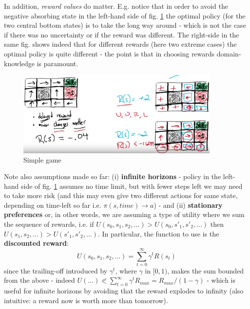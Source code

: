\documentclass[11pt]{article}
\begin{document}
In addition, \textit{reward values} do matter. E.g. notice that in order to avoid the negative absorbing state in the left-hand side of fig. \ref{reinforcement_1} the optimal policy (for the two central bottom states) is to take the long way around - which is not the case if there was no uncertainty or if the reward was different. The right-side in the same fig. shows indeed that for different rewards (here two extreme cases) the optimal policy is quite different - the point is that in choosing rewards domain-knowledge is paramount.
\begin{figure}[htbp] 
	\centering
	\includegraphics[width=0.9\textwidth]{pics/reinforcement_1}
	\caption{Simple game} 
	\label{reinforcement_1}
\end{figure}

Note also assumptions made so far: (i) \textbf{infinite horizons} - policy in the left-hand side of fig. \ref{reinforcement_1} assumes no time limit, but with fewer steps left we may need to take more risk (and this may even give two different actions for same state, depending on time-left so far i.e. $\pi(s, time) \rightarrow a$) - and (ii) \textbf{stationary preferences} or, in other words, we are assuming a type of utility where we  sum the sequence of rewards, i.e. if $U(s_0,s_1, s_2, \ldots ) > U(s_0,s'_1, s'_2, \ldots)$ then $U(s_1, s_2, \ldots) > U(s'_1, s'_2, \ldots)$. In particular, the function to use is the \textbf{discounted reward}:
\[	U(s_0,s_1, s_2, \ldots ) = \sum_{t=0}^{\infty} \gamma^t R(s_t)
\]
since the trailing-off introduced by $\gamma^t$, where $\gamma$ in $[0, 1)$,  makes the sum bounded from the above - indeed $U(\ldots )\eqslantless \sum_{t=0}^{\infty} \gamma^t R_{max} = R_{max} / (1-\gamma)$ - which is useful for infinite horizons by avoiding that the reward explodes to infinity (also intuitive: a reward now is worth more than tomorrow).
\end{document}
